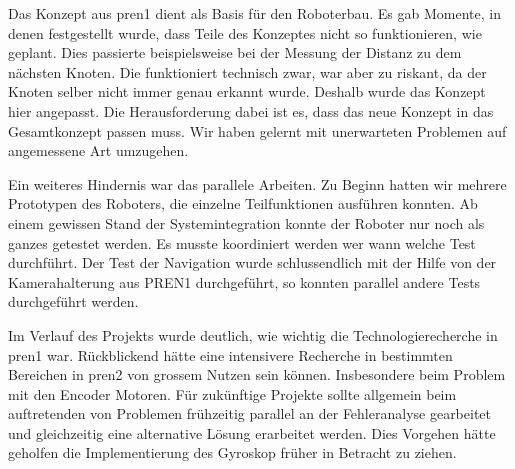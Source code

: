 Das Konzept aus \acrshort{pren1} dient als Basis für den Roboterbau. Es gab Momente, in denen festgestellt wurde, dass Teile des Konzeptes nicht so funktionieren, wie geplant. Dies passierte beispielsweise bei der Messung der Distanz zu dem nächsten Knoten. Die funktioniert technisch zwar, war aber zu riskant, da der Knoten selber nicht immer genau erkannt wurde. Deshalb wurde das Konzept hier angepasst. Die Herausforderung dabei ist es, dass das neue Konzept in das Gesamtkonzept passen muss. Wir haben gelernt mit unerwarteten Problemen auf angemessene Art umzugehen.

Ein weiteres Hindernis war das parallele Arbeiten. Zu Beginn hatten wir mehrere Prototypen des Roboters, die einzelne Teilfunktionen ausführen konnten. Ab einem gewissen Stand der Systemintegration konnte der Roboter nur noch als ganzes getestet werden. Es musste koordiniert werden wer wann welche Test durchführt. Der Test der Navigation wurde schlussendlich mit der Hilfe von der Kamerahalterung aus PREN1 durchgeführt, so konnten parallel andere Tests durchgeführt werden.

Im Verlauf des Projekts wurde deutlich, wie wichtig die Technologierecherche in \acrshort{pren1} war. Rückblickend hätte eine intensivere Recherche in bestimmten Bereichen in \acrshort{pren2} von grossem Nutzen sein können. Insbesondere beim Problem mit den Encoder Motoren. Für zukünftige Projekte sollte allgemein beim auftretenden von Problemen frühzeitig parallel an der Fehleranalyse gearbeitet und gleichzeitig eine alternative Lösung erarbeitet werden. Dies Vorgehen hätte geholfen die Implementierung des Gyroskop früher in Betracht zu ziehen.

